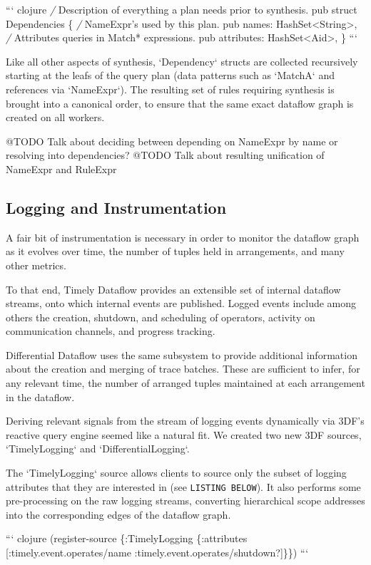 \documentclass[../index.tex]{subfiles}
\begin{document}
``` clojure
\emph{/} Description of everything a plan needs prior to synthesis.
pub struct Dependencies \{
    \emph{/} NameExpr's used by this plan.
    pub names: HashSet<String>,
    \emph{/} Attributes queries in Match* expressions.
    pub attributes: HashSet<Aid>,
\}
```

Like all other aspects of synthesis, `Dependency` structs are
collected recursively starting at the leafs of the query plan (data
patterns such as `MatchA` and references via `NameExpr`). The
resulting set of rules requiring synthesis is brought into a canonical
order, to ensure that the same exact dataflow graph is created on all
workers.

@TODO Talk about deciding between depending on NameExpr by name or resolving into dependencies?
@TODO Talk about resulting unification of NameExpr and RuleExpr

\subsection{Logging and Instrumentation}

A fair bit of instrumentation is necessary in order to monitor the
dataflow graph as it evolves over time, the number of tuples held in
arrangements, and many other metrics.

To that end, Timely Dataflow provides an extensible set of internal
dataflow streams, onto which internal events are published. Logged
events include among others the creation, shutdown, and scheduling of
operators, activity on communication channels, and progress tracking.

Differential Dataflow uses the same subsystem to provide additional
information about the creation and merging of trace batches. These are
sufficient to infer, for any relevant time, the number of arranged
tuples maintained at each arrangement in the dataflow.

Deriving relevant signals from the stream of logging events
dynamically via 3DF's reactive query engine seemed like a natural
fit. We created two new 3DF sources, `TimelyLogging` and
`DifferentialLogging`.

The `TimelyLogging` source allows clients to source only the subset of
logging attributes that they are interested in (see \texttt{LISTING
BELOW}). It also performs some pre-processing on the raw logging
streams, converting hierarchical scope addresses into the
corresponding edges of the dataflow graph.

``` clojure
(register-source
  \{:TimelyLogging
   \{:attributes [:timely.event.operates/name
                 :timely.event.operates/shutdown?]\}\})
```
\end{document}
